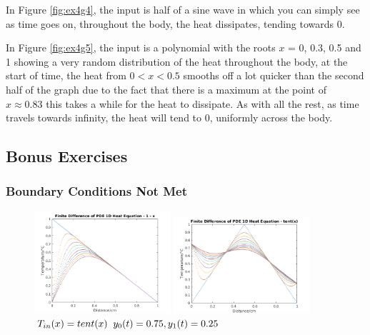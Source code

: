 \documentclass[11pt,a4paper]{article}
\begin{document}
In Figure \ref{fig:ex4g4}, the input is half of a sine wave in which you can simply see as time goes on, throughout the body, the heat dissipates, tending towards 0.

\vspace{4mm}In Figure \ref{fig:ex4g5}, the input is a polynomial with the roots $x$ = 0, 0.3, 0.5 and 1 showing a very random distribution of the heat throughout the body, at the start of time, the heat from $0 < x < 0.5$ smooths off a lot quicker than  the second half of the graph due to the fact that there is a maximum at the point of $x \approx 0.83$ this takes a while for the heat to dissipate. As with all the rest, as time travels towards infinity, the heat will tend to 0, uniformly across the body.

\vspace{40mm}
\subsection{Bonus Exercises}
\subsubsection{Boundary Conditions Not Met}

\begin{figure}
	\vspace{-10mm}
	\includegraphics[width=0.45\textwidth]{Ex4_Figs/1-xbcdiff.png}
	\vspace{-3mm}
	\caption{$T_{in}(x)= 1-x$}
	\label{fig:ex4g6}
		\includegraphics[width=0.45\textwidth]{Ex4_Figs/Tentbc.png}
		\vspace{-3mm}
	\caption{$T_{in}(x)= tent(x) \hspace{2mm} y_0(t) = 0.75, y_1(t) = 0.25$}
	\label{fig:ex4g7}
\end{figure}
\end{document}
